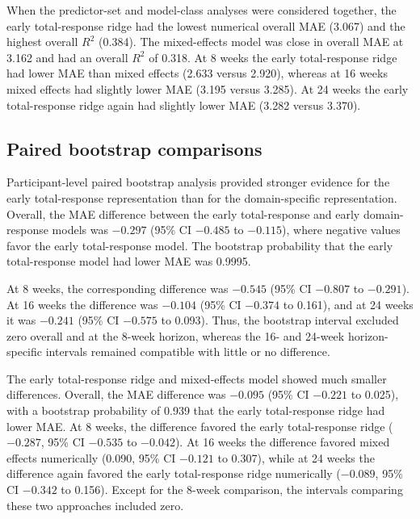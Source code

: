 \documentclass[11pt]{article}
\begin{document}
When the predictor-set and model-class analyses were considered together,
the early total-response ridge had the lowest numerical overall MAE
(3.067) and the highest overall $R^2$ (0.384). The mixed-effects model
was close in overall MAE at 3.162 and had an overall $R^2$ of 0.318.
At 8 weeks the early total-response ridge had lower MAE than mixed
effects (2.633 versus 2.920), whereas at 16 weeks mixed effects had
slightly lower MAE (3.195 versus 3.285). At 24 weeks the early
total-response ridge again had slightly lower MAE
(3.282 versus 3.370).


\subsection{Paired bootstrap comparisons}

Participant-level paired bootstrap analysis provided stronger evidence
for the early total-response representation than for the domain-specific
representation. Overall, the MAE difference between the early
total-response and early domain-response models was $-0.297$
(95\% CI $-0.485$ to $-0.115$), where negative values favor the
early total-response model. The bootstrap probability that the early
total-response model had lower MAE was 0.9995.

At 8 weeks, the corresponding difference was $-0.545$
(95\% CI $-0.807$ to $-0.291$). At 16 weeks the difference was
$-0.104$ (95\% CI $-0.374$ to 0.161), and at 24 weeks it was
$-0.241$ (95\% CI $-0.575$ to 0.093). Thus, the bootstrap interval
excluded zero overall and at the 8-week horizon, whereas the
16- and 24-week horizon-specific intervals remained compatible with
little or no difference.

The early total-response ridge and mixed-effects model showed much
smaller differences. Overall, the MAE difference was $-0.095$
(95\% CI $-0.221$ to 0.025), with a bootstrap probability of 0.939
that the early total-response ridge had lower MAE. At 8 weeks,
the difference favored the early total-response ridge
($-0.287$, 95\% CI $-0.535$ to $-0.042$). At 16 weeks the
difference favored mixed effects numerically
(0.090, 95\% CI $-0.121$ to 0.307), while at 24 weeks the
difference again favored the early total-response ridge numerically
($-0.089$, 95\% CI $-0.342$ to 0.156). Except for the 8-week
comparison, the intervals comparing these two approaches included zero.
\end{document}
